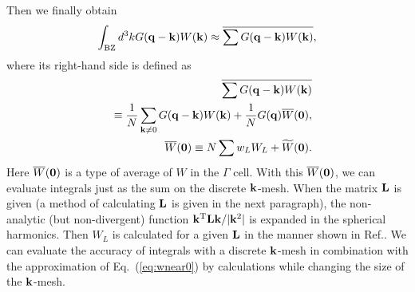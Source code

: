 \documentclass[a4paper,10pt,epsf,fleqn]{article}
\newcommand{\bfzero}{{\bf 0}}
\newcommand{\bfq}{{\bf q}}
\newcommand{\bfk}{{\bf k}}
\newcommand{\req}[1]{\mbox{Eq.~(\ref{#1})}}
\begin{document}
Then we finally obtain
\begin{eqnarray}
\int_{\rm BZ} d^3k G(\bfq-\bfk) W(\bfk) 
\approx \overline{\sum G(\bfq-\bfk) W(\bfk)},\label{eq:bzintbar}
\end{eqnarray}
where its right-hand side is defined as
\begin{eqnarray}
&&\overline{\sum G(\bfq-\bfk) W(\bfk)} \nonumber \\
&&\equiv 
\frac{1}{N} \sum_{\bfk \ne 0} G(\bfq-\bfk) W(\bfk) + \frac{1}{N} G(\bfq)\overline{W}(\bfzero),\\
&&\overline{W}(\bfzero)\equiv N\sum w_L W_L + \widetilde{W}(\bfzero).
\end{eqnarray}
Here $\overline{W}(\bfzero)$ is a type of 
average of $W$ in the $\Gamma$ cell.
With this $\overline{W}(\bfzero)$, we can 
evaluate integrals just as the sum on the discrete $\bfk$-mesh.
When the matrix ${\bf L}$ is given 
(a method of calculating ${\bf L}$ is given in the next paragraph),
the non-analytic (but non-divergent) function 
${\bfk^{\rm T}{\bf L}\bfk}/|\bfk^2|$ 
is expanded in the spherical harmonics. Then
$W_L$ is calculated for a given ${\bf L}$ in the manner shown in Ref.\cite{friedrich_efficient_2010}. 
We can evaluate the accuracy of integrals with a discrete $\bfk$-mesh
in combination with the approximation of \req{eq:wnear0} 
by calculations while changing the size of the $\bfk$-mesh.




\end{document}
